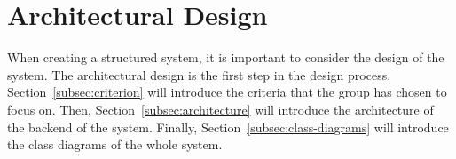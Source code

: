 \section{Architectural Design}\label{sec:architectural-design}

When creating a structured system, it is important to consider the design of the system.
The architectural design is the first step in the design process.
Section~\ref{subsec:criterion} will introduce the criteria that the group has chosen to focus on.
Then, Section~\ref{subsec:architecture} will introduce the architecture of the backend of the system.
Finally, Section~\ref{subsec:class-diagrams} will introduce the class diagrams of the whole system.




